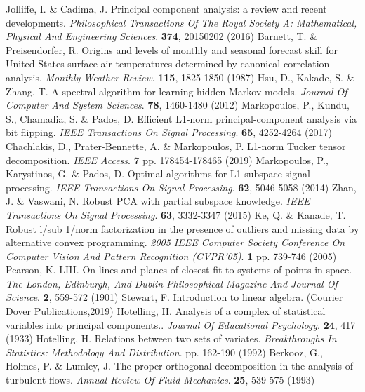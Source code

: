 \documentclass[sn-mathphys-num]{sn-jnl}%
\begin{document}
\begin{thebibliography}{000}
Jolliffe, I. \& Cadima, J. Principal component analysis: a review and recent developments. {\em Philosophical Transactions Of The Royal Society A: Mathematical, Physical And Engineering Sciences}. \textbf{374}, 20150202 (2016)
Barnett, T. \& Preisendorfer, R. Origins and levels of monthly and seasonal forecast skill for United States surface air temperatures determined by canonical correlation analysis. {\em Monthly Weather Review}. \textbf{115}, 1825-1850 (1987)
Hsu, D., Kakade, S. \& Zhang, T. A spectral algorithm for learning hidden Markov models. {\em Journal Of Computer And System Sciences}. \textbf{78}, 1460-1480 (2012)
Markopoulos, P., Kundu, S., Chamadia, S. \& Pados, D. Efficient L1-norm principal-component analysis via bit flipping. {\em IEEE Transactions On Signal Processing}. \textbf{65}, 4252-4264 (2017)
Chachlakis, D., Prater-Bennette, A. \& Markopoulos, P. L1-norm Tucker tensor decomposition. {\em IEEE Access}. \textbf{7} pp. 178454-178465 (2019)
Markopoulos, P., Karystinos, G. \& Pados, D. Optimal algorithms for L1-subspace signal processing. {\em IEEE Transactions On Signal Processing}. \textbf{62}, 5046-5058 (2014)
Zhan, J. \& Vaswani, N. Robust PCA with partial subspace knowledge. {\em IEEE Transactions On Signal Processing}. \textbf{63}, 3332-3347 (2015)
Ke, Q. \& Kanade, T. Robust l/sub 1/norm factorization in the presence of outliers and missing data by alternative convex programming. {\em 2005 IEEE Computer Society Conference On Computer Vision And Pattern Recognition (CVPR'05)}. \textbf{1} pp. 739-746 (2005)
Pearson, K. LIII. On lines and planes of closest fit to systems of points in space. {\em The London, Edinburgh, And Dublin Philosophical Magazine And Journal Of Science}. \textbf{2}, 559-572 (1901)
Stewart, F. Introduction to linear algebra. (Courier Dover Publications,2019)
Hotelling, H. Analysis of a complex of statistical variables into principal components.. {\em Journal Of Educational Psychology}. \textbf{24}, 417 (1933)
Hotelling, H. Relations between two sets of variates. {\em Breakthroughs In Statistics: Methodology And Distribution}. pp. 162-190 (1992)
Berkooz, G., Holmes, P. \& Lumley, J. The proper orthogonal decomposition in the analysis of turbulent flows. {\em Annual Review Of Fluid Mechanics}. \textbf{25}, 539-575 (1993)

\end{thebibliography}
\end{document}

